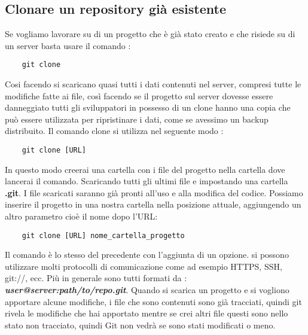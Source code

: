 \subsection{Clonare un repository già esistente}
Se vogliamo lavorare su di un progetto che è già stato creato e che risiede su di un server basta usare il comando :
\begin{lstlisting}
	git clone 
\end{lstlisting}
Cosi facendo si scaricano quasi tutti i dati contenuti nel server, compresi tutte le modifiche fatte ai file, così facendo se il progetto sul server dovesse essere danneggiato tutti gli sviluppatori in possesso di un clone hanno una copia che può essere utilizzata per ripristinare i dati, come se avessimo un backup distribuito.
Il comando clone si utilizza nel seguente modo :
\begin{lstlisting}
	git clone [URL]
\end{lstlisting}
In questo modo creerai una cartella con i file del progetto nella cartella dove lancerai il comando.
Scaricando tutti gli ultimi file e impostando una cartella \textbf{.git}. I file scaricati saranno già pronti all'uso e alla modifica del codice. Possiamo inserire il progetto in una nostra cartella nella posizione attuale, aggiungendo un altro parametro cioè il nome dopo l'URL:
\begin{lstlisting}
	git clone [URL] nome_cartella_progetto
\end{lstlisting} 
Il comando è lo stesso del precedente con l'aggiunta di un opzione. si possono utilizzare molti protocolli di comunicazione come ad esempio HTTPS, SSH, git://, ecc. Più in generale sono tutti formati da : \textbf{\textit{user@server:path/to/repo.git}}.
Quando si scarica un progetto e si vogliono apportare alcune modifiche, i file che sono contenuti sono già tracciati, quindi git rivela le modifiche che hai apportato mentre se crei altri file questi sono nello stato non tracciato, quindi Git non vedrà se sono stati modificati o meno.
\begin{figure}
	
\end{figure}